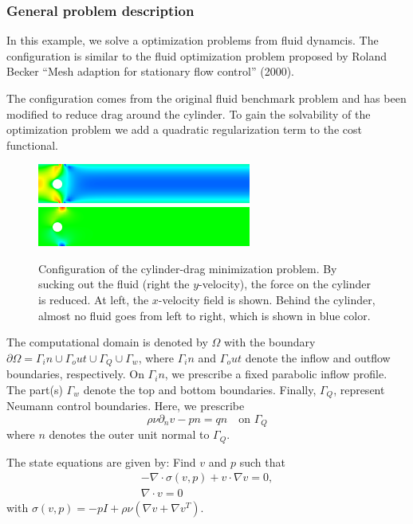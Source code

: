 \subsubsection{General problem description}
In this example, we solve a optimization problems from 
fluid dynamcis. The configuration is similar to 
the fluid optimization problem proposed by Roland Becker 
``Mesh adaption for stationary flow control'' (2000).

The configuration
    comes from the original fluid benchmark problem
    and has been modified to reduce drag around the
    cylinder. To gain the solvability of
    the optimization problem we add a quadratic
    regularization term to the cost functional.


\begin{figure}[h]
\centering
    {\includegraphics[width=7cm]{Documentation/visit_Nov_15_2013_0000_a.png}}
    {\includegraphics[width=7cm]{Documentation/visit_Nov_15_2013_0001_a.png}}
  \caption{Configuration of the cylinder-drag minimization problem. 
By sucking out the fluid (right the $y$-velocity), 
the force on the cylinder is reduced. At left, the $x$-velocity field 
is shown. Behind the cylinder, almost no fluid goes from left to right, 
which is shown in blue color.}
  \label{ex_2_plots}
\end{figure}

The computational domain is denoted by $\Omega$ with the 
boundary $\partial\Omega
= \Gamma_in \cup \Gamma_out \cup \Gamma_Q \cup \Gamma_w$, 
where $\Gamma_in$ and $\Gamma_out$ denote the inflow and outflow
boundaries, respectively. On $\Gamma_in$, we prescribe a fixed parabolic 
inflow profile. The part(s) $\Gamma_w$ denote the top and bottom 
boundaries. Finally, $\Gamma_Q$, represent Neumann control boundaries. Here,
we prescribe 
\[
\rho\nu \partial_n v - pn = qn \quad\text{on } \Gamma_Q
\] 
where $n$ denotes the outer unit normal to $\Gamma_Q$. 

The state equations are given by: Find $v$ and $p$ such that
\begin{align*}
- \nabla\cdot \sigma(v,p) + v\cdot \nabla v = 0,\\
\nabla\cdot v = 0
\end{align*}
with $\sigma(v,p) = -pI + \rho\nu(\nabla v + \nabla v^T)$.

